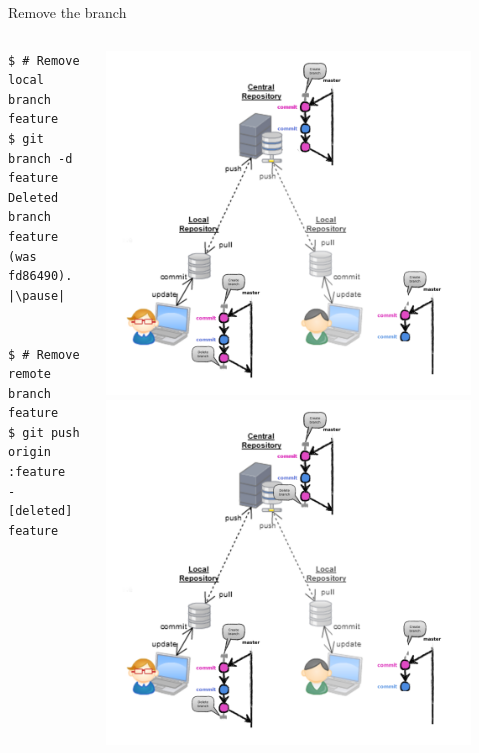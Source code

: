\begin{frame}[fragile]{Remove the branch}
\begin{columns}
	\begin{column}{0.6\textwidth}
  	\begin{lstlisting}
$ # Remove local branch feature
$ git branch -d feature
Deleted branch feature (was fd86490). |\pause|


$ # Remove remote branch feature
$ git push origin :feature
- [deleted] feature
	\end{lstlisting}
	\end{column}
	\begin{column}{0.4\textwidth}
		\begin{center}
			 {
				\includegraphics[width=0.9\textwidth]{multiuser_my_delete.png}
			}\only<2> {
				\includegraphics[width=0.9\textwidth]{multiuser_remote_delete.png}
			}
		\end{center}
	\end{column}
\end{columns}
\end{frame}


